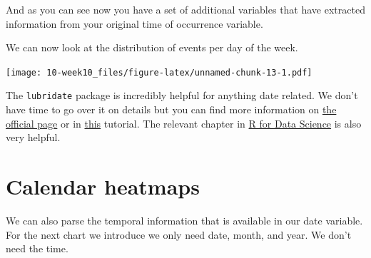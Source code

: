 \documentclass[]{book}
\newenvironment{Shaded}{\begin{snugshade}}{\end{snugshade}}
\newcommand{\DataTypeTok}[1]{\textcolor[rgb]{0.13,0.29,0.53}{#1}}
\newcommand{\KeywordTok}[1]{\textcolor[rgb]{0.13,0.29,0.53}{\textbf{#1}}}
\newcommand{\NormalTok}[1]{#1}
\newcommand{\OperatorTok}[1]{\textcolor[rgb]{0.81,0.36,0.00}{\textbf{#1}}}
\newcommand{\OtherTok}[1]{\textcolor[rgb]{0.56,0.35,0.01}{#1}}
\newcommand{\StringTok}[1]{\textcolor[rgb]{0.31,0.60,0.02}{#1}}
\begin{document}
And as you can see now you have a set of additional variables that have extracted information from your original time of occurrence variable.

We can now look at the distribution of events per day of the week.

\begin{Shaded}
\end{Shaded}

\texttt{[image: 10-week10\_files/figure-latex/unnamed-chunk-13-1.pdf]}

The \texttt{lubridate} package is incredibly helpful for anything date related. We don't have time to go over it on details but you can find more information on \href{https://lubridate.tidyverse.org/}{the official page} or in \href{https://mikoontz.github.io/data-carpentry-week/lesson_lubridate.html}{this} tutorial. The relevant chapter in \href{https://r4ds.had.co.nz/dates-and-times.html\#introduction-10}{R for Data Science} is also very helpful.

\hypertarget{calendar-heatmaps}{%
\section{Calendar heatmaps}\label{calendar-heatmaps}}

We can also parse the temporal information that is available in our date variable. For the next chart we introduce we only need date, month, and year. We don't need the time.

\begin{Shaded}
\end{Shaded}
\end{document}
